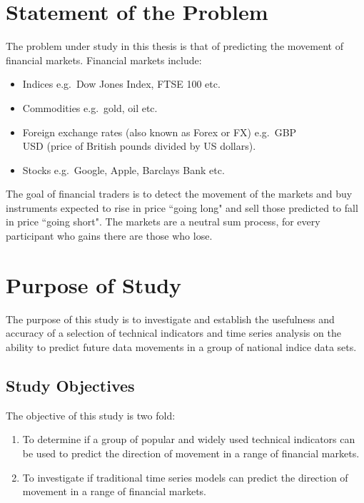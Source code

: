 

\section{Statement of the Problem}
The problem under study in this thesis is that of predicting the movement of financial markets. Financial markets include:
\begin{itemize}
\item Indices e.g.\ Dow Jones Index, FTSE 100 etc.
\item Commodities e.g.\ gold, oil etc.
\item Foreign exchange rates (also known as Forex or FX) e.g.\ GBP\\USD (price of British pounds divided by US dollars).
\item Stocks e.g.\ Google, Apple, Barclays Bank etc.
\end{itemize}
The goal of financial traders is to detect the movement of the markets and buy instruments expected to rise in price \textquotedblleft going long" and sell those predicted to fall in price \textquotedblleft going short". The markets are a neutral sum process, for every participant who gains there are those who lose.

\section{Purpose of Study}
The purpose of this study is to investigate and establish the usefulness and accuracy of a selection of technical indicators and time series analysis on the ability to predict future data movements in a group of national indice data sets.

\subsection{Study Objectives}
The objective of this study is two fold:

\begin{enumerate}
\item To determine if a group of popular and widely used technical indicators can be used to predict the direction of movement in a range of financial markets.
\item To investigate if traditional time series models can predict the direction of movement in a range of financial markets.
\end{enumerate}

